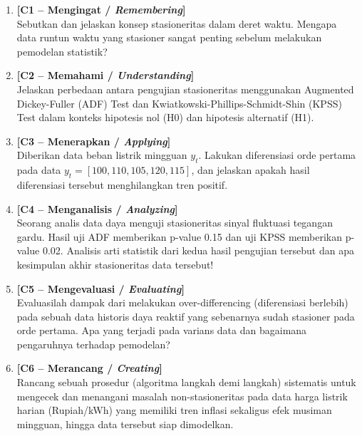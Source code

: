 \documentclass[11pt,a4paper]{article}
\begin{document}
\begin{enumerate}[leftmargin=1.8em, label=\textbf{Soal \arabic*.}]
    
    \item \textbf{[C1 -- Mengingat / \textit{Remembering}]} \\
    Sebutkan dan jelaskan konsep stasioneritas dalam deret waktu. Mengapa data runtun waktu yang stasioner sangat penting sebelum melakukan pemodelan statistik?
    \vspace{2.2cm}

    \item \textbf{[C2 -- Memahami / \textit{Understanding}]} \\
    Jelaskan perbedaan antara pengujian stasioneritas menggunakan Augmented Dickey-Fuller (ADF) Test dan Kwiatkowski-Phillips-Schmidt-Shin (KPSS) Test dalam konteks hipotesis nol (H0) dan hipotesis alternatif (H1).
    \vspace{2.8cm}

    \item \textbf{[C3 -- Menerapkan / \textit{Applying}]} \\
    Diberikan data beban listrik mingguan $y_t$. Lakukan diferensiasi orde pertama pada data $y_t = [100, 110, 105, 120, 115]$, dan jelaskan apakah hasil diferensiasi tersebut menghilangkan tren positif.
    \vspace{2.8cm}

    \newpage

    \item \textbf{[C4 -- Menganalisis / \textit{Analyzing}]} \\
    Seorang analis data daya menguji stasioneritas sinyal fluktuasi tegangan gardu. Hasil uji ADF memberikan p-value 0.15 dan uji KPSS memberikan p-value 0.02. Analisis arti statistik dari kedua hasil pengujian tersebut dan apa kesimpulan akhir stasioneritas data tersebut!
    \vspace{3.5cm}

    \item \textbf{[C5 -- Mengevaluasi / \textit{Evaluating}]} \\
    Evaluasilah dampak dari melakukan over-differencing (diferensiasi berlebih) pada sebuah data historis daya reaktif yang sebenarnya sudah stasioner pada orde pertama. Apa yang terjadi pada varians data dan bagaimana pengaruhnya terhadap pemodelan?
    \vspace{3.5cm}

    \item \textbf{[C6 -- Merancang / \textit{Creating}]} \\
    Rancang sebuah prosedur (algoritma langkah demi langkah) sistematis untuk mengecek dan menangani masalah non-stasioneritas pada data harga listrik harian (Rupiah/kWh) yang memiliki tren inflasi sekaligus efek musiman mingguan, hingga data tersebut siap dimodelkan.
    \vspace{4.5cm}

\end{enumerate}
\end{document}
